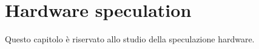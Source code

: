 \chapter{Hardware speculation}

Questo capitolo è riservato allo studio della speculazione hardware.
